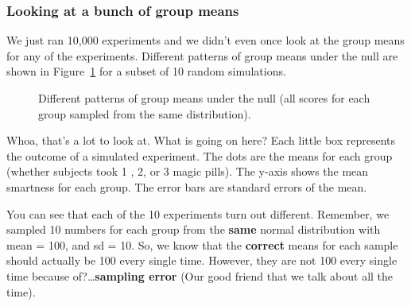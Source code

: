 \documentclass[
  letterpaper,
  DIV=11,
  numbers=noendperiod]{scrreprt}
\begin{document}
\subsubsection{Looking at a bunch of group
means}\label{looking-at-a-bunch-of-group-means}

We just ran 10,000 experiments and we didn't even once look at the group
means for any of the experiments. Different patterns of group means
under the null are shown in Figure~\ref{fig-8manyDiffs} for a subset of
10 random simulations.

\begin{figure}


\caption{\label{fig-8manyDiffs}Different patterns of group means under
the null (all scores for each group sampled from the same
distribution).}

\end{figure}%

Whoa, that's a lot to look at. What is going on here? Each little box
represents the outcome of a simulated experiment. The dots are the means
for each group (whether subjects took 1 , 2, or 3 magic pills). The
y-axis shows the mean smartness for each group. The error bars are
standard errors of the mean.

You can see that each of the 10 experiments turn out different.
Remember, we sampled 10 numbers for each group from the \textbf{same}
normal distribution with mean = 100, and sd = 10. So, we know that the
\textbf{correct} means for each sample should actually be 100 every
single time. However, they are not 100 every single time because
of?\ldots{}\textbf{sampling error} (Our good friend that we talk about
all the time).
\end{document}
